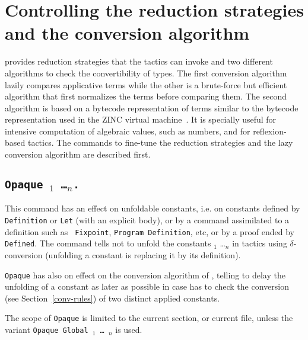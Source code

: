 

\section{Controlling the reduction strategies and the conversion algorithm}

{\Coq} provides reduction strategies that the tactics can invoke and
two different algorithms to check the convertibility of types.
The first conversion algorithm lazily
compares applicative terms while the other is a brute-force but efficient
algorithm that first normalizes the terms before comparing them.  The
second algorithm is based on a bytecode representation of terms
similar to the bytecode representation used in the ZINC virtual
machine~\cite{Leroy90}. It is specially useful for intensive
computation of algebraic values, such as numbers, and for reflexion-based
tactics. The commands to fine-tune the reduction strategies and the
lazy conversion algorithm are described first.

\subsection[\tt Opaque \qualid$_1$ \dots \qualid$_n$.]{\tt Opaque \qualid$_1$ \dots \qualid$_n$.\label{Opaque}} 
This command has an effect on unfoldable constants, i.e. 
on constants defined by {\tt Definition} or {\tt Let} (with an explicit
body), or by a command assimilated to a definition such as {\tt
Fixpoint}, {\tt Program Definition}, etc, or by a proof ended by {\tt
Defined}. The command tells not to unfold
the constants {\qualid$_1$} \dots {\qualid$_n$} in tactics using
$\delta$-conversion (unfolding a constant is replacing it by its
definition).

{\tt Opaque} has also on effect on the conversion algorithm of {\Coq},
telling to delay the unfolding of a constant as later as possible in
case {\Coq} has to check the conversion (see Section~\ref{conv-rules})
of two distinct applied constants.

The scope of {\tt Opaque} is limited to the current section, or
current file, unless the variant {\tt Opaque Global \qualid$_1$ \dots
\qualid$_n$} is used.

